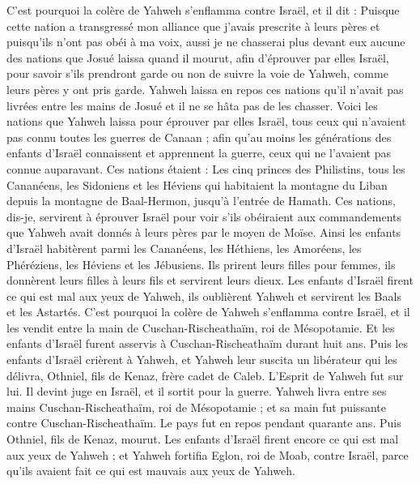 \begin{multicols}{2}
C'est pourquoi la colère de Yahweh s'enflamma contre Israël, et il dit : Puisque cette nation a transgressé mon alliance que j'avais prescrite à leurs pères et puisqu'ils n'ont pas obéi à ma voix,
aussi je ne chasserai plus devant eux aucune des nations que Josué laissa quand il mourut,
afin d'éprouver par elles Israël, pour savoir s'ils prendront garde ou non de suivre la voie de Yahweh, comme leurs pères y ont pris garde.
Yahweh laissa en repos ces nations qu'il n'avait pas livrées entre les mains de Josué et il ne se hâta pas de les chasser.
\VerseOne{}Voici les nations que Yahweh laissa pour éprouver par elles Israël, tous ceux qui n'avaient pas connu toutes les guerres de Canaan ; 
afin qu'au moins les générations des enfants d'Israël connaissent et apprennent la guerre, ceux qui ne l'avaient pas connue auparavant.
Ces nations étaient : Les cinq princes des Philistins, tous les Cananéens, les Sidoniens et les Héviens qui habitaient la montagne du Liban depuis la montagne de Baal-Hermon, jusqu'à l'entrée de Hamath.
Ces nations, dis-je, servirent à éprouver Israël pour voir s'ils obéiraient aux commandements que Yahweh avait donnés à leurs pères par le moyen de Moïse.
Ainsi les enfants d'Israël habitèrent parmi les Cananéens, les Héthiens, les Amoréens, les Phéréziens, les Héviens et les Jébusiens.
Ils prirent leurs filles pour femmes, ils donnèrent leurs filles à leurs fils et servirent leurs dieux.
Les enfants d'Israël firent ce qui est mal aux yeux de Yahweh, ils oublièrent Yahweh et servirent les Baals et les Astartés.
C'est pourquoi la colère de Yahweh s'enflamma contre Israël, et il les vendit entre la main de Cuschan-Rischeathaïm, roi de Mésopotamie. Et les enfants d'Israël furent asservis à Cuschan-Rischeathaïm durant huit ans.
Puis les enfants d'Israël crièrent à Yahweh, et Yahweh leur suscita un libérateur qui les délivra, Othniel, fils de Kenaz, frère cadet de Caleb.
L'Esprit de Yahweh fut sur lui. Il devint juge en Israël, et il sortit pour la guerre. Yahweh livra entre ses mains Cuschan-Rischeathaïm, roi de Mésopotamie ; et sa main fut puissante contre Cuschan-Rischeathaïm.
Le pays fut en repos pendant quarante ans. Puis Othniel, fils de Kenaz, mourut.
Les enfants d'Israël firent encore ce qui est mal aux yeux de Yahweh ; et Yahweh fortifia Eglon, roi de Moab, contre Israël, parce qu'ils avaient fait ce qui est mauvais aux yeux de Yahweh.

\end{multicols}
